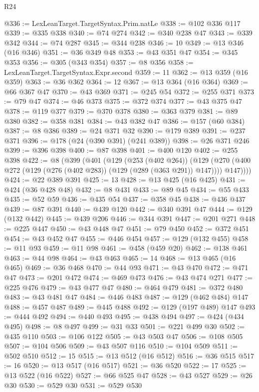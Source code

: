 \begin{lexlean}{R24}
\begin{coremodule}
@336 := LexLeanTarget.TargetSyntax.Prim.natLe
@338 := @102 @336 @117
@339 := @335 @338
@340 := @74 @274
@342 := @340 @238 @47
@343 := @339 @342
@344 := @74 @287
@345 := @344 @238
@346 := 10
@349 := @13 @346 (@16 @346)
@351 := @36 @349 @48
@353 := @43 @351 @47
@354 := @345 @353
@356 := @305 (@343 @354)
@357 := @8 @356
@358 := LexLeanTarget.TargetSyntax.Expr.second
@359 := 11
@362 := @13 @359 (@16 @359)
@363 := @36 @362
@364 := 12
@367 := @13 @364 (@16 @364)
@369 := @66 @367 @47
@370 := @43 @369
@371 := @245 @54
@372 := @255 @371
@373 := @79 @47
@374 := @46 @373
@375 := @372 @374
@377 := @43 @375 @47
@378 := @119 @377
@379 := @370 @378
@380 := @363 @379
@381 := @89 @380
@382 := @358 @381
@384 := @43 @382 @47
@386 := @157 (@60 @384)
@387 := @8 @386
@389 := @24 @371 @32
@390 := @179 @389
@391 := @237 @371
@396 := @178 (@24 (@390 @391) (@241 @389))
@398 := @26 @371 @246
@399 := @396 @398
@400 := @87 @398
@401 := @400 @120
@402 := @255 @398
@422 := @8
    (@399
      (@401
        (@129
          (@253 (@402 @264))
          (@129 (@270 (@400 @272 (@129 (@276 (@402 @283)) (@129 (@289 (@363 @291)) @147)))) @147))))
@424 := @22 @389 @391
@425 := 13
@428 := @13 @425 (@16 @425)
@431 := @424 (@36 @428 @48)
@432 := @8 @431
@433 := @89 @45
@434 := @55 @433
@435 := @52 @59
@436 := @435 @54
@437 := @358 @45
@438 := @436 @437
@439 := @87 @391
@440 := @439 @120
@442 := @340 @391 @47
@444 := @129 (@132 @442)
@445 := @439 @206
@446 := @344 @391
@447 := @201 @271
@448 := @225 @447
@450 := @43 @448 @47
@451 := @79 @450
@452 := @372 @451
@454 := @43 @452 @47
@455 := @446 @454
@457 := @129 (@132 @455)
@458 := @11 @93
@459 := @11 @98
@461 := @458 (@459 @20)
@462 := @138 @461
@463 := @44 @98
@464 := @43 @463
@465 := 14
@468 := @13 @465 (@16 @465)
@469 := @36 @468
@470 := @44 @93
@471 := @43 @470
@472 := @471 @47
@473 := @201 @472
@474 := @469 @473
@476 := @43 @474 @271
@477 := @225 @476
@479 := @43 @477 @47
@480 := @464 @479
@481 := @372 @480
@483 := @43 @481 @47
@484 := @446 @483
@487 := @129 (@462 @484) @147
@488 := @457 @487
@489 := @445 @488
@492 := @129 (@197 @489) @147
@493 := @444 @492
@494 := @440 @493
@495 := @438 @494
@497 := @424 (@434 @495)
@498 := @8 @497
@499 := @31 @33
@501 := @221 @499 @30
@502 := @435 @110
@503 := @106 @122
@505 := @43 @503 @47
@506 := @108 @505
@507 := @104 @506
@509 := @43 @507 @116
@510 := @104 @509
@511 := @502 @510
@512 := 15
@515 := @13 @512 (@16 @512)
@516 := @36 @515
@517 := 16
@520 := @13 @517 (@16 @517)
@521 := @36 @520
@522 := 17
@525 := @13 @522 (@16 @522)
@527 := @66 @525 @47
@528 := @43 @527
@529 := @26 @30
@530 := @529 @30
@531 := @529 @530

\end{coremodule}
\end{lexlean}
